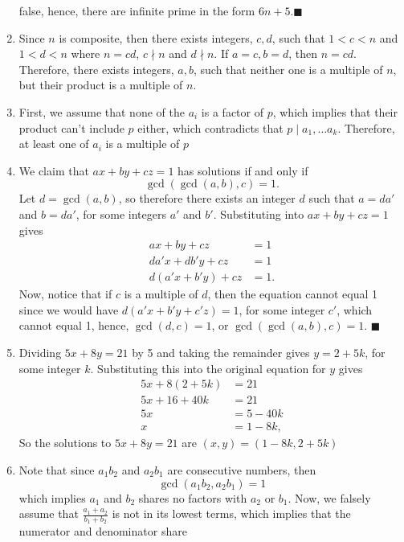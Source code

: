 \documentclass[12pt]{article}
\begin{document}
\begin{enumerate}
    false, hence, there are infinite prime in the form $6n+5$.\hfill $\blacksquare$
    \item Since $n$ is composite, then there exists integers, $c,d$, such that 
    $1<c<n$ and $1<d<n$ where $n = cd$, $c \nmid n$ and $d \nmid n$. If 
    $a = c, b = d$, then $n = cd$. Therefore, there exists integers, $a,b$, 
    such that neither one is a multiple of $n$, but their product is a multiple 
    of $n$.
    \item First, we assume that none of the $a_i$ is a factor of $p$, which implies 
    that their product can't include $p$ either, which contradicts that $p \mid a_1,\ldots a_k$.
    Therefore, at least one of $a_i$ is a multiple of $p$
    \item We claim that $ax + by + cz = 1$ has solutions if and only if 
    \[\gcd(\gcd(a,b),c) = 1.\] Let $d = \gcd(a,b)$, so therefore there exists 
    an integer $d$ such that $a = da'$ and $b = da'$, for some integers $a'$ 
    and $b'$. Substituting into 
    $ax + by + cz = 1$ gives 
    \begin{align*}
        ax + by + cz &= 1\\
        da'x + db'y + cz &= 1\\
        d(a'x + b'y) + cz &= 1.
    \end{align*}
    Now, notice that if $c$ is a multiple of $d$, then the equation cannot equal 
    1 since we would have $d(a'x + b'y + c'z) = 1$, for some integer $c'$, which 
    cannot equal 1, hence, $\gcd(d,c) = 1$, or $\gcd(\gcd(a,b),c) = 1$. \hfill $\blacksquare$
    \item Dividing $5x + 8y = 21$ by 5 and taking the remainder gives $y = 2 + 5k$, 
    for some integer $k$. Substituting this into the original equation for $y$ gives 
    \begin{align*}
        5x+8(2+5k) &= 21 \\
        5x + 16 + 40k &= 21 \\
        5x &= 5 - 40k \\
        x &= 1- 8k,
    \end{align*}
    So the solutions to $5x + 8y = 21$ are $(x,y) = (1-8k, 2 +5k)$
    \item Note that since $a_1b_2$ and $a_2b_1$ are consecutive numbers, then 
    \[\gcd(a_1b_2, a_2b_1) = 1\] which implies $a_1$ and $b_2$ shares no factors with 
    $a_2$ or $b_1$. Now, we falsely assume that $\frac{a_1 + a_2}{b_1+b_2}$ is not 
    in its lowest terms, which implies that the numerator and denominator share 

\end{enumerate}
\end{document}
